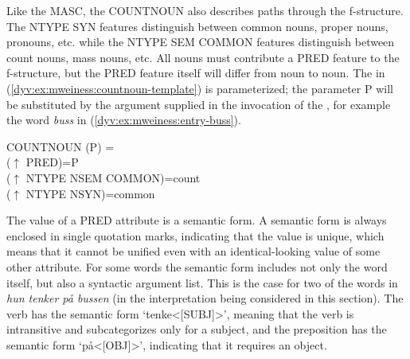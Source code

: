 \documentclass[output=paper]{langsci/langscibook}
\begin{document}
Like the  MASC, the  COUNTNOUN also describes paths through the f-structure.
The NTYPE SYN features distinguish between common nouns, proper nouns, pronouns, etc. while the NTYPE SEM COMMON features distinguish between count nouns, mass nouns, etc.
All nouns must contribute a PRED feature to the f-structure, but the PRED feature itself will differ from noun to noun.
The  in (\ref{dyv:ex:mweiness:countnoun-template}) is parameterized; the parameter P will be substituted by the argument supplied in the invocation of the , for example the word \textit{buss} in (\ref{dyv:ex:mweiness:entry-buss}).


\ea\label{dyv:ex:mweiness:countnoun-template}
{\small 
COUNTNOUN (P) = \\
\hspace{2em}  ($\uparrow$ PRED)=P \\
\hspace{2em}  ($\uparrow$ NTYPE NSEM COMMON)=count \\
\hspace{2em}  ($\uparrow$ NTYPE NSYN)=common \\
}
\z

The value of a PRED attribute is a semantic form.
A semantic form is always enclosed in single quotation marks, indicating that the value is unique, which means that it cannot be unified even with an identical-looking value of some other attribute.
For some words the semantic form includes not only the word itself, but also a syntactic argument list.
This is the case for two of the words in \textit{hun tenker på bussen} (in the interpretation being considered in this section).
The verb has the semantic form `tenke<[SUBJ]>', meaning that the verb is intransitive and subcategorizes only for a subject, and the preposition has the semantic form `på<[OBJ]>', indicating that it requires an object.
\end{document}
